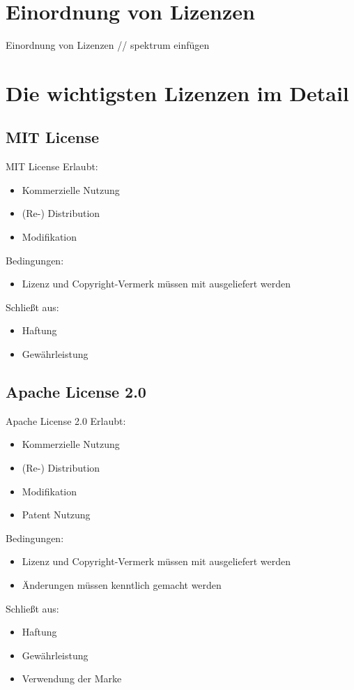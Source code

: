 \documentclass{beamer}
\begin{document}
\section{Einordnung von Lizenzen}
\begin{frame}{Einordnung von Lizenzen}
	// spektrum einfügen
\end{frame}

\section{Die wichtigsten Lizenzen im Detail}
\subsection{MIT License}
\begin{frame}{MIT License}
	Erlaubt:
	\begin{itemize}
		\item Kommerzielle Nutzung
		\item (Re-) Distribution
		\item Modifikation
	\end{itemize}

	Bedingungen:
	\begin{itemize}
		\item Lizenz und Copyright-Vermerk müssen mit ausgeliefert werden
	\end{itemize}

	Schließt aus:
	\begin{itemize}
		\item Haftung
		\item Gewährleistung
	\end{itemize}
\end{frame}

\subsection{Apache License 2.0}
\begin{frame}{Apache License 2.0}
	Erlaubt:
	\begin{itemize}
		\item Kommerzielle Nutzung
		\item (Re-) Distribution
		\item Modifikation
		\item Patent Nutzung
	\end{itemize}

	Bedingungen:
	\begin{itemize}
		\item Lizenz und Copyright-Vermerk müssen mit ausgeliefert werden
		\item Änderungen müssen kenntlich gemacht werden
	\end{itemize}

	Schließt aus:
	\begin{itemize}
		\item Haftung
		\item Gewährleistung
		\item Verwendung der Marke
	\end{itemize}
\end{frame}
\end{document}
